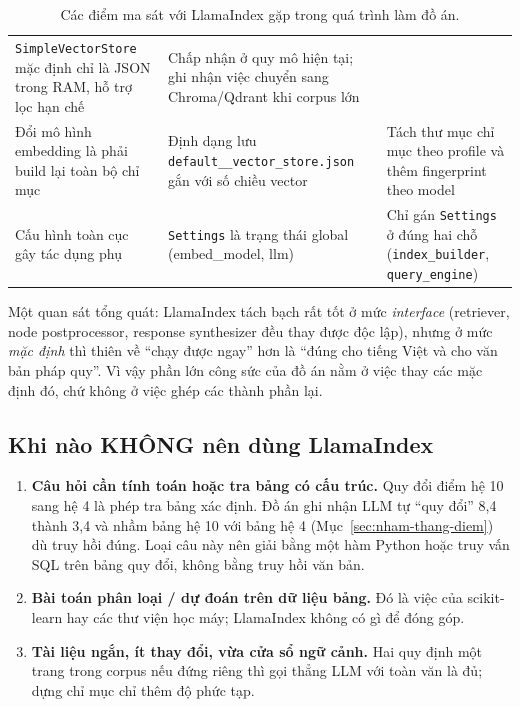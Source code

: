 \begin{table}[H]
\begin{tabularx}{\textwidth}{>{\hsize=1.05\hsize}X >{\hsize=1.05\hsize}X >{\hsize=0.9\hsize}X}
      \texttt{SimpleVectorStore} mặc định chỉ là JSON trong RAM, hỗ trợ lọc hạn chế &
      Chấp nhận ở quy mô hiện tại; ghi nhận việc chuyển sang Chroma/Qdrant khi corpus lớn \\
    Đổi mô hình embedding là phải build lại toàn bộ chỉ mục &
      Định dạng lưu \texttt{default\_\_vector\_store.json} gắn với số chiều vector &
      Tách thư mục chỉ mục theo profile và thêm fingerprint theo model \\
    Cấu hình toàn cục gây tác dụng phụ &
      \texttt{Settings} là trạng thái global (embed\_model, llm) &
      Chỉ gán \texttt{Settings} ở đúng hai chỗ (\texttt{index\_builder}, \texttt{query\_engine}) \\
    \bottomrule
  \end{tabularx}
  \caption{Các điểm ma sát với LlamaIndex gặp trong quá trình làm đồ án.}
  \label{tab:ma-sat}
\end{table}

Một quan sát tổng quát: LlamaIndex tách bạch rất tốt ở mức \emph{interface} (retriever, node
postprocessor, response synthesizer đều thay được độc lập), nhưng ở mức \emph{mặc định} thì thiên
về ``chạy được ngay'' hơn là ``đúng cho tiếng Việt và cho văn bản pháp quy''. Vì vậy phần lớn công
sức của đồ án nằm ở việc thay các mặc định đó, chứ không ở việc ghép các thành phần lại.

\subsection{Khi nào KHÔNG nên dùng LlamaIndex}

\begin{enumerate}
  \item \textbf{Câu hỏi cần tính toán hoặc tra bảng có cấu trúc.} Quy đổi điểm hệ 10 sang hệ 4 là phép tra
        bảng xác định. Đồ án ghi nhận LLM tự ``quy đổi'' 8,4 thành 3,4 và nhầm bảng hệ 10 với bảng hệ 4
        (Mục~\ref{sec:nham-thang-diem}) dù truy hồi đúng. Loại câu này nên giải bằng một hàm Python hoặc
        truy vấn SQL trên bảng quy đổi, không bằng truy hồi văn bản.
  \item \textbf{Bài toán phân loại / dự đoán trên dữ liệu bảng.} Đó là việc của scikit-learn hay các
        thư viện học máy; LlamaIndex không có gì để đóng góp.
  \item \textbf{Tài liệu ngắn, ít thay đổi, vừa cửa sổ ngữ cảnh.} Hai quy định một trang trong corpus nếu
        đứng riêng thì gọi thẳng LLM với toàn văn là đủ; dựng chỉ mục chỉ thêm độ phức tạp.
\end{enumerate}

